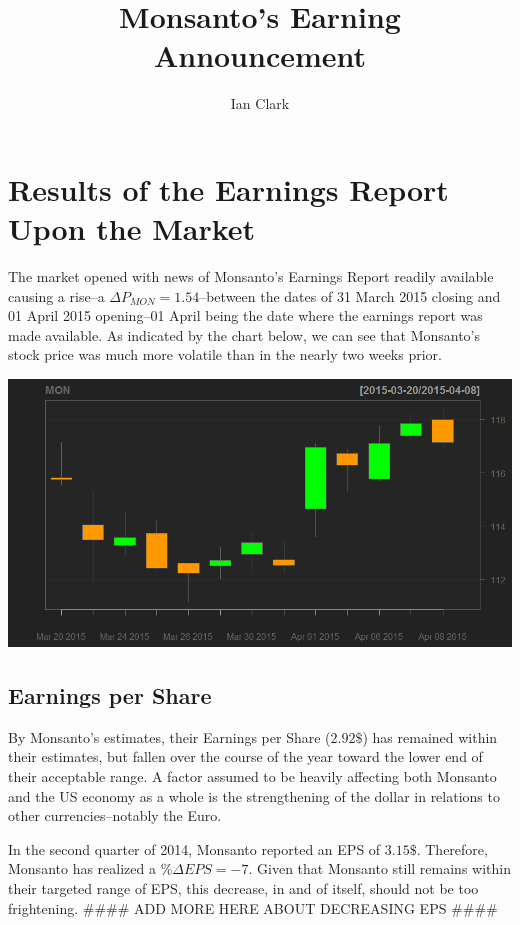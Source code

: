 \documentclass[11pt,letterpaper,english]{article}
\title{Monsanto's Earning Announcement}
\author{Ian Clark}
\date{}
\newcommand{\newpar}{\vspace{10mm}\noindent}
\begin{document}
\maketitle

\section{Results of the Earnings Report Upon the Market}
The market opened with news of Monsanto's Earnings Report readily available causing a rise--a $\Delta{P_{MON}} = 1.54 $--between the dates of 31 March 2015 closing and 01 April 2015 opening--01 April being the date where the earnings report was made available. As indicated by the chart below, we can see that Monsanto's stock price was much more volatile than in the nearly two weeks prior.

\begin{center}
\includegraphics[scale=0.5]{Data/CandleChart.png}
\end{center}

\subsection{Earnings per Share}
By Monsanto's estimates, their Earnings per Share ($2.92 \$ $) has remained within their estimates, but fallen over the course of the year toward the lower end of their acceptable range. A factor assumed to be heavily affecting both Monsanto and the US economy as a whole is the strengthening of the dollar in relations to other currencies--notably the Euro.

\newpar
In the second quarter of 2014, Monsanto reported an EPS of $3.15 \$ $. Therefore, Monsanto has realized a $\%\Delta{EPS} = -7$. Given that Monsanto still remains within their targeted range of EPS, this decrease, in and of itself, should not be too frightening. \#\#\#\# ADD MORE HERE ABOUT DECREASING EPS \#\#\#\#
\end{document}
